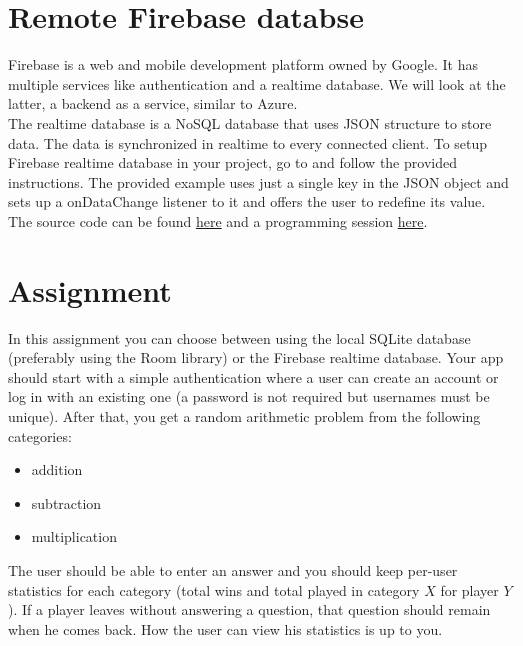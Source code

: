 \section{Remote Firebase databse}
Firebase is a web and mobile development platform owned by Google. It has multiple services like authentication and a realtime database. We will look at the latter, a backend as a service, similar to Azure.\\

The realtime database is a NoSQL database that uses JSON structure to store data. The data is synchronized in realtime to every connected client. To setup Firebase realtime database in your project, go to  and follow the provided instructions. The provided example uses just a single key in the JSON object and sets up a onDataChange listener to it and offers the user to redefine its value. The source code can be found \href{https://github.com/JonSteinn/AndroidDevelopment/tree/master/examples/lab5/firebase}{here} and a programming session \href{TODO}{here}.

\section{Assignment}
In this assignment you can choose between using the local SQLite database (preferably using the Room library) or the Firebase realtime database. Your app should start with a simple authentication where a user can create an account or log in with an existing one (a password is not required but usernames must be unique). After that, you get a random arithmetic problem from the following categories:
\begin{itemize}
\item addition
\item subtraction
\item multiplication
\end{itemize}
The user should be able to enter an answer and you should keep per-user statistics for each category (total wins and total played in category $X$ for player $Y$). If a player leaves without answering a question, that question should remain when he comes back. How the user can view his statistics is up to you.